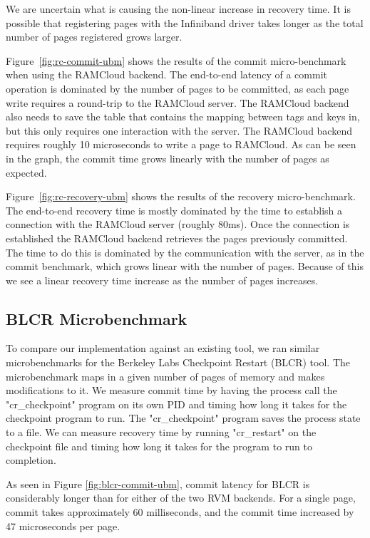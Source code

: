 We are uncertain what is causing the non-linear increase in recovery time.
It is possible that registering pages with the Infiniband driver takes
longer as the total number of pages registered grows larger.

Figure~\ref{fig:rc-commit-ubm} shows the results of the commit micro-benchmark
when using the RAMCloud backend.  The end-to-end latency of a commit operation
is dominated by the number of pages to be committed, as each page write
requires a round-trip to the RAMCloud server.  The RAMCloud backend also needs
to save the table that contains the mapping between tags and keys in, but this
only requires one interaction with the server.  The RAMCloud backend requires
roughly 10 microseconds to write a page to RAMCloud. As can be seen in the
graph, the commit time grows linearly with the number of pages as expected.

Figure~\ref{fig:rc-recovery-ubm} shows the results of the recovery
micro-benchmark.  The end-to-end recovery time is mostly dominated by the time
to establish a connection with the RAMCloud server (roughly 80ms).  Once the
connection is established the RAMCloud backend retrieves the pages previously
committed. The time to do this is dominated by the communication with the
server, as in the commit benchmark, which grows linear with the number of
pages.  Because of this we see a linear recovery time increase as the number of
pages increases.

\subsection{BLCR Microbenchmark}

To compare our implementation against an existing tool, we ran similar
microbenchmarks for the Berkeley Labs Checkpoint Restart (BLCR) tool.
The microbenchmark maps in a given number of pages of memory and makes
modifications to it. We measure commit time by having the process call the
"cr\_checkpoint" program on its own PID and timing how long it takes for the
checkpoint program to run. The "cr\_checkpoint" program saves the process state
to a file. We can measure recovery time by running "cr\_restart" on the
checkpoint file and timing how long it takes for the program to run to completion.

As seen in Figure \ref{fig:blcr-commit-ubm}, commit latency for BLCR is
considerably longer than for either of the two RVM backends. For a single page,
commit takes approximately 60 milliseconds, and the commit time increased by
47 microseconds per page.

